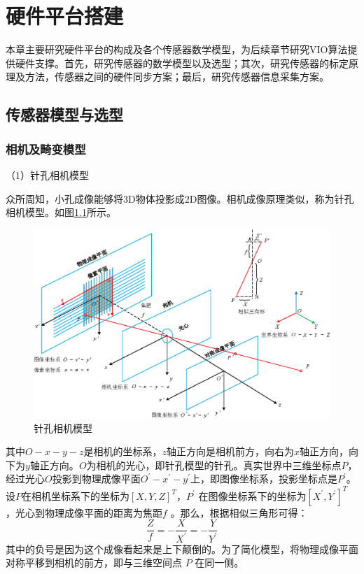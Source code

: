 \chapter{硬件平台搭建}
\label{chap:2}
本章主要研究硬件平台的构成及各个传感器数学模型，为后续章节研究VIO算法提供硬件支撑。首先，研究传感器的数学模型以及选型；其次，研究传感器的标定原理及方法，传感器之间的硬件同步方案；最后，研究传感器信息采集方案。
\section{传感器模型与选型}
\subsection{相机及畸变模型}
\label{chap:2.1.1}
（1）针孔相机模型

众所周知，小孔成像能够将3D物体投影成2D图像。相机成像原理类似，称为针孔相机模型。如图\ref{fig2_1}所示。
\begin{figure}[h]\setlength{\belowcaptionskip}{-12pt}
	\centering
	\includegraphics[width=1\textwidth]{figures/chapter2/fig2_1}
	\caption{针孔相机模型}\label{fig2_1}
\end{figure}
其中$O-x-y-z $是相机的坐标系，$z $轴正方向是相机前方，向右为$x $轴正方向，向下为$y $轴正方向。$O $为相机的光心，即针孔模型的针孔。真实世界中三维坐标点$P$，经过光心$O $投影到物理成像平面$O^{\prime}-x^{\prime}-y^{\prime}$上，即图像坐标系，投影坐标点是$P^{\prime} $。设$P$在相机坐标系下的坐标为$[X, Y, Z]^{T} $，$P^{\prime} $ 在图像坐标系下的坐标为$[X^{\prime}, Y^{\prime}]^{T} $ ，光心到物理成像平面的距离为焦距$f$ 。那么，根据相似三角形可得：
\begin{equation}
\label{eqn:2.1}
	\frac{Z}{f}=-\frac{X}{X^{\prime}}=-\frac{Y}{Y^{\prime}}
\end{equation}
其中的负号是因为这个成像看起来是上下颠倒的。为了简化模型，将物理成像平面对称平移到相机的前方，即与三维空间点 $P$ 在同一侧。


